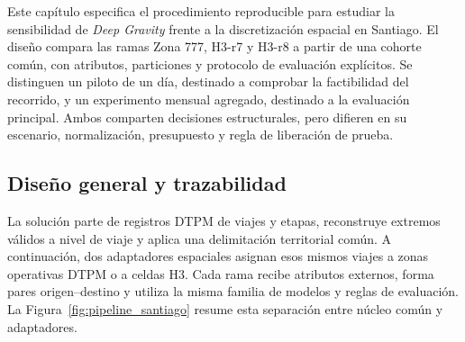 \label{sec:cap4}

Este capítulo especifica el procedimiento reproducible para estudiar la sensibilidad de \textit{Deep Gravity} frente a la discretización espacial en Santiago. El diseño compara las ramas Zona 777, H3-r7 y H3-r8 a partir de una cohorte común, con atributos, particiones y protocolo de evaluación explícitos. Se distinguen un piloto de un día, destinado a comprobar la factibilidad del recorrido, y un experimento mensual agregado, destinado a la evaluación principal. Ambos comparten decisiones estructurales, pero difieren en su escenario, normalización, presupuesto y regla de liberación de prueba.

\subsection{Diseño general y trazabilidad}
\label{sec:diseno_general}

La solución parte de registros DTPM de viajes y etapas, reconstruye extremos válidos a nivel de viaje y aplica una delimitación territorial común. A continuación, dos adaptadores espaciales asignan esos mismos viajes a zonas operativas DTPM o a celdas H3. Cada rama recibe atributos externos, forma pares origen--destino y utiliza la misma familia de modelos y reglas de evaluación. La Figura~\ref{fig:pipeline_santiago} resume esta separación entre núcleo común y adaptadores.

